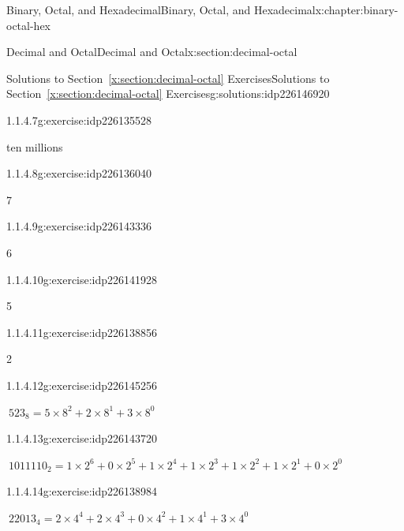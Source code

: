 \documentclass[twoside,10pt,]{book}
\newcommand{\xreffont}{\relax}
\numberwithin{equation}{section}
\begin{document}
\begin{chapterptx}{Binary, Octal, and Hexadecimal}{}{Binary, Octal, and Hexadecimal}{}{}{x:chapter:binary-octal-hex}
\begin{sectionptx}{Decimal and Octal}{}{Decimal and Octal}{}{}{x:section:decimal-octal}
\begin{solutions-subsection}{Solutions to Section~{\xreffont\ref*{x:section:decimal-octal}} Exercises}{}{Solutions to Section~{\xreffont\ref*{x:section:decimal-octal}} Exercises}{}{}{g:solutions:idp226146920}
\begin{exercisegroup}
\begin{divisionsolutioneg}{1.1.4.7}{}{g:exercise:idp226135528}
\par\smallskip%
\noindent\hypertarget{g:solution:idp226138216-main}{}ten millions\end{divisionsolutioneg}%
\end{exercisegroup}
\par\medskip\noindent
\begin{exercisegroup}
\begin{divisionsolutioneg}{1.1.4.8}{}{g:exercise:idp226136040}%
\par\smallskip%
\noindent\hypertarget{g:solution:idp226134376-main}{}7\end{divisionsolutioneg}%
\begin{divisionsolutioneg}{1.1.4.9}{}{g:exercise:idp226143336}%
\par\smallskip%
\noindent\hypertarget{g:solution:idp226139624-main}{}6\end{divisionsolutioneg}%
\begin{divisionsolutioneg}{1.1.4.10}{}{g:exercise:idp226141928}%
\par\smallskip%
\noindent\hypertarget{g:solution:idp226142568-main}{}5\end{divisionsolutioneg}%
\begin{divisionsolutioneg}{1.1.4.11}{}{g:exercise:idp226138856}%
\par\smallskip%
\noindent\hypertarget{g:solution:idp226144104-main}{}2\end{divisionsolutioneg}%
\end{exercisegroup}
\par\medskip\noindent
\begin{exercisegroup}
\begin{divisionsolutioneg}{1.1.4.12}{}{g:exercise:idp226145256}%
\par\smallskip%
\noindent\hypertarget{g:solution:idp226140136-main}{}\(\ 523_8=5\times 8^2+2\times 8^1+3\times 8^0\)\end{divisionsolutioneg}%
\begin{divisionsolutioneg}{1.1.4.13}{}{g:exercise:idp226143720}%
\par\smallskip%
\noindent\hypertarget{g:solution:idp226141672-main}{}\(\ 1011110_2=1\times2^6+0\times2^5+1\times2^4+1\times2^3+1\times2^2+1\times2^1+0\times2^0\)\end{divisionsolutioneg}%
\begin{divisionsolutioneg}{1.1.4.14}{}{g:exercise:idp226138984}%
\par\smallskip%
\noindent\hypertarget{g:solution:idp226139368-main}{}\(\ 22013_4=2\times 4^4+2\times4^3+0\times4^2+1\times4^1+3\times4^0\)\end{divisionsolutioneg}%

\end{exercisegroup}
\end{solutions-subsection}
\end{sectionptx}
\end{chapterptx}
\end{document}
